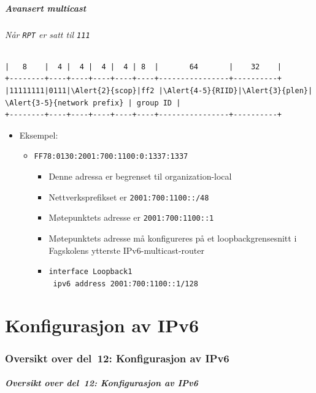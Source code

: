 \begin{frame}[fragile]%
  \frametitle{Avansert multicast}
  \framesubtitle{Når \texttt{RPT} er satt til \texttt{111}}
\begin{Verbatim}[commandchars=\\\{\},fontsize=\tiny]
|   8    |  4 |  4 |  4 |  4 | 8  |       64       |    32    |
+--------+----+----+----+----+----+----------------+----------+
|11111111|0111|\Alert{2}{scop}|ff2 |\Alert{4-5}{RIID}|\Alert{3}{plen}| \Alert{3-5}{network prefix} | group ID |
+--------+----+----+----+----+----+----------------+----------+
\end{Verbatim}
  \begin{itemize}%
  \item Eksempel:
    \begin{itemize}%
    \item \texttt{FF7\alert<2>{8}:0\alert<4-5>{1}\alert<3>{30}:\alert<3-5>{2001:700:1100:0}:1337:1337}
      \begin{itemize}%
      \item Denne adressa er begrenset til \alert<2>{organization-local}
      \item Nettverksprefikset er \texttt{\alert<3>{2001:700:1100}::/\alert<3>{48}}
      \item Møtepunktets adresse er \alert<5>{\texttt{\alert<4>{2001:700:1100}::\alert<4>{1}}}
      \item Møtepunktets adresse må konfigureres på et
        loopbackgrensesnitt i Fagskolens ytterste
        IPv6-multicast-router
      \item \texttt{interface Loopback1}\\
        \texttt{\ \alert<5>{ipv6 address 2001:700:1100::1/128}}
      \end{itemize}
    \end{itemize}
  \end{itemize}
\end{frame}

\part{Konfigurasjon av IPv6}

\begin{frame}
  \partpage
\end{frame}

\section*{Oversikt over del~12: Konfigurasjon av IPv6}
\begin{frame}[allowframebreaks]
  \frametitle{Oversikt over del~12: Konfigurasjon av IPv6}
    \tableofcontents%
\end{frame}

